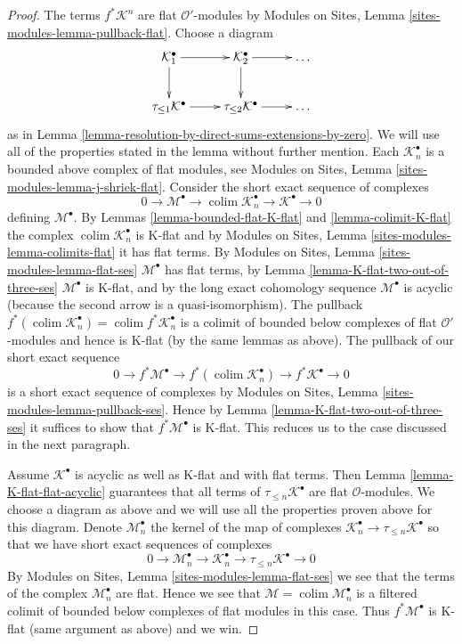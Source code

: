 \documentclass[10pt,a4paper]{amsart}
\theoremstyle{plain}
\theoremstyle{definition}
\theoremstyle{remark}
\numberwithin{equation}{subsection}
\def\colim{\mathop{\mathrm{colim}}\nolimits}
\begin{document}
\begin{proof}
The terms $f^*\mathcal{K}^n$ are flat $\mathcal{O}'$-modules by
Modules on Sites, Lemma \ref{sites-modules-lemma-pullback-flat}.
Choose a diagram
$$
\xymatrix{
\mathcal{K}_1^\bullet \ar[d] \ar[r] &
\mathcal{K}_2^\bullet \ar[d] \ar[r] & \ldots \\
\tau_{\leq 1}\mathcal{K}^\bullet \ar[r] &
\tau_{\leq 2}\mathcal{K}^\bullet \ar[r] & \ldots
}
$$
as in Lemma \ref{lemma-resolution-by-direct-sums-extensions-by-zero}.
We will use all of the properties stated in the
lemma without further mention. Each $\mathcal{K}_n^\bullet$ is a bounded
above complex of flat modules, see
Modules on Sites, Lemma \ref{sites-modules-lemma-j-shriek-flat}.
Consider the short exact sequence of complexes
$$
0 \to \mathcal{M}^\bullet \to
\colim \mathcal{K}_n^\bullet \to
\mathcal{K}^\bullet \to 0
$$
defining $\mathcal{M}^\bullet$. By Lemmas \ref{lemma-bounded-flat-K-flat} and
\ref{lemma-colimit-K-flat} the complex $\colim \mathcal{K}_n^\bullet$
is K-flat and by Modules on Sites, Lemma \ref{sites-modules-lemma-colimits-flat}
it has flat terms. By Modules on Sites, Lemma \ref{sites-modules-lemma-flat-ses}
$\mathcal{M}^\bullet$ has flat terms, by
Lemma \ref{lemma-K-flat-two-out-of-three-ses}
$\mathcal{M}^\bullet$ is K-flat, and by the long exact
cohomology sequence $\mathcal{M}^\bullet$ is acyclic (because
the second arrow is a quasi-isomorphism). The pullback
$f^*(\colim \mathcal{K}_n^\bullet) = \colim f^*\mathcal{K}_n^\bullet$
is a colimit of bounded below complexes of flat $\mathcal{O}'$-modules
and hence is K-flat (by the same lemmas as above).
The pullback of our short exact sequence
$$
0 \to f^*\mathcal{M}^\bullet \to
f^*(\colim \mathcal{K}_n^\bullet) \to
f^*\mathcal{K}^\bullet \to 0
$$
is a short exact sequence of complexes by
Modules on Sites, Lemma \ref{sites-modules-lemma-pullback-ses}.
Hence by Lemma \ref{lemma-K-flat-two-out-of-three-ses}
it suffices to show that $f^*\mathcal{M}^\bullet$
is K-flat. This reduces us to the case discussed in the next paragraph.

\medskip\noindent
Assume $\mathcal{K}^\bullet$ is acyclic as well as K-flat and
with flat terms. Then Lemma \ref{lemma-K-flat-flat-acyclic}
guarantees that all terms of $\tau_{\leq n}\mathcal{K}^\bullet$
are flat $\mathcal{O}$-modules. We choose a diagram as above and
we will use all the properties proven above for this diagram.
Denote $\mathcal{M}_n^\bullet$ the kernel of the map of complexes
$\mathcal{K}_n^\bullet \to \tau_{\leq n}\mathcal{K}^\bullet$
so that we have short exact sequences of complexes
$$
0 \to \mathcal{M}_n^\bullet \to \mathcal{K}_n^\bullet \to
\tau_{\leq n}\mathcal{K}^\bullet \to 0
$$
By Modules on Sites, Lemma \ref{sites-modules-lemma-flat-ses}
we see that the terms of the complex $\mathcal{M}_n^\bullet$ are flat.
Hence we see that $\mathcal{M} = \colim \mathcal{M}_n^\bullet$
is a filtered colimit of bounded below complexes of flat modules
in this case. Thus $f^*\mathcal{M}^\bullet$ is K-flat
(same argument as above) and we win.
\end{proof}
\end{document}
